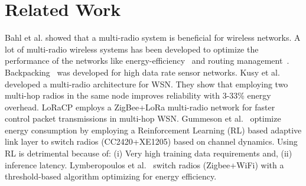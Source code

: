 \section{Related Work}
\label{sec:related_work}

Bahl et al. \cite{bahl2004reconsidering} showed that a multi-radio system is beneficial for wireless networks. A lot of multi-radio wireless systems \cite{ananthanarayanan2009blue, sur2017wifi} has been developed to optimize the performance of the networks like energy-efficiency~\cite{jin2011wizi, kusy2014radio, lymberopoulos2008towards} and routing management~\cite{draves2004routing}. Backpacking~\cite{al2011backpacking} was developed for high data rate sensor networks. Kusy et al.~\cite{kusy2014radio} developed a multi-radio architecture for WSN. They show that employing two multi-hop radios in the same node improves reliability with 3-33\% energy overhead. LoRaCP \cite{gu2019one} employs a ZigBee+LoRa multi-radio network for faster control packet transmissions in multi-hop WSN. Gummeson et al.~\cite{gummeson2009adaptive} optimize
energy consumption by employing a Reinforcement Learning (RL) based adaptive link layer to switch radios (CC2420+XE1205) based on channel dynamics. Using RL is detrimental because of: (i) Very high training data requirements and, (ii) inference latency\cite{sundaram2024mars}. Lymberopoulos et al.~\cite{lymberopoulos2008towards} switch radios (Zigbee+WiFi) with a threshold-based algorithm optimizing for energy efficiency.

